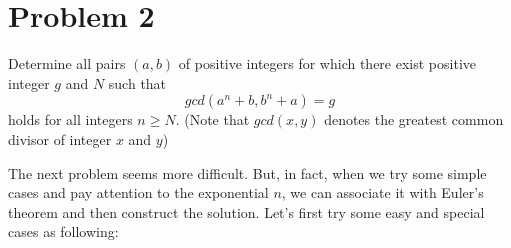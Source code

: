 \documentclass{Math_Note}
\begin{document}
\section*{Problem 2}
\begin{prb}
    Determine all pairs $\left(a,b\right)$ of positive integers for which there exist positive integer $g$ and $N$ such that 
    \begin{equation}
        gcd\left(a^{n}+b,b^{n}+a\right) = g
    \end{equation}
    holds for all integers $n\geq N$. (Note that $gcd(x,y)$ denotes the greatest common divisor of integer $x$ and $y$)
\end{prb}
\begin{sol}
The next problem seems more difficult. But, in fact, when we try some simple cases and pay attention to the exponential $n$, we can 
associate it with Euler's theorem and then construct the solution.
\newline\newline
\marginpar{\textcolor{red}{motivation}}
Let's first try some easy and special cases as following: 


\end{sol}
\end{document}
